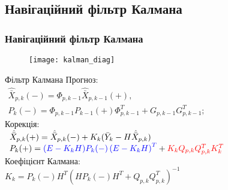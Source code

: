 \documentclass[ucs,compress]{beamer}    %
\begin{document}
\subsection{Навігаційний фільтр Калмана} 
\begin{frame}[plain]
\frametitle{Навігаційний фільтр Калмана}
\begin{figure}[l]
\texttt{[image: kalman\_diag]}
\end{figure}
\begin{block}{Фільтр Калмана}
\small
Прогноз: \\
$\begin{array}{l} 
{\hat{\bar{X}}_{p,k}(-) =\Phi_{p,k-1} \hat{\bar{X}}_{p,k-1}(+) ,} \\ 
{P_{k}(-) =\Phi_{p,k-1} P_{k-1}(+) \Phi ^{T}_{p,k-1} +G_{p,k-1} G_{p,k-1}^{T} ;} \end{array} $ \\
Корекція:\\
$\begin{array}{l} 
{\hat{\bar{X}}_{p,k}(+)=\hat{\bar{X}}_{p,k}(-) + K_{k} (\bar{Y}_{k} -H\hat{\bar{X}}_{p,k} )} \\ 
{P_{k}(+)={\color{blue}(E-K_{k} H)P_{k}(-) \left(E-K_{k} H\right)^{T}} +{\color{red} K_{k} Q_{p,k} Q_{p,k} ^{T} K_{k}^{T}} } 
\end{array} $ \\
Коефіцієнт Калмана:\\
$K_{k} =P_{k}(-) H^{T} (HP_{k}(-) H^{T} +Q_{p,k} Q_{p,k} ^{T} )^{-1} $
\end{block}
\end{frame}
\end{document}
